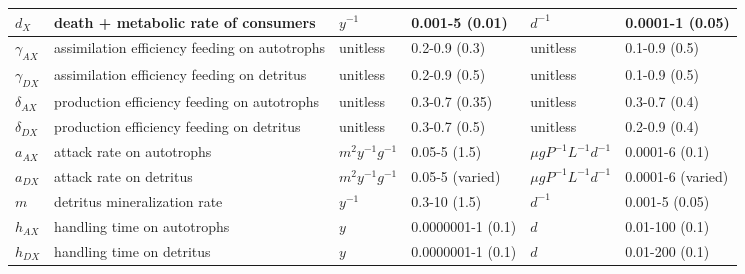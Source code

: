\documentclass[12pt,a4paper,oneside]{article}
\begin{document}
\begin{center}
{\begin{tabular}{ | p{1.5cm} |  p{4cm} | p{1.75cm} | p{2.5cm} || p{2.25cm} | p{2cm} | }
\(d_{X}\) & death + metabolic rate of consumers & \(y^{-1}\) & 0.001-5 (0.01) & \(d^{-1}\) & 0.0001-1 (0.05)\\\hline

\(\gamma_{AX}\) & assimilation efficiency  feeding on autotrophs & unitless & 0.2-0.9 (0.3) & unitless   & 0.1-0.9 (0.5)\\\hline

\(\gamma_{DX}\) & assimilation efficiency  feeding on detritus & unitless & 0.2-0.9 (0.5) & unitless &  0.1-0.9 (0.5)\\\hline

\(\delta_{AX}\) & production efficiency  feeding on autotrophs & unitless & 0.3-0.7 (0.35) & unitless   & 0.3-0.7 (0.4)\\\hline

\(\delta_{DX}\) & production efficiency feeding on detritus & unitless &  0.3-0.7 (0.5) & unitless &  0.2-0.9 (0.4)\\\hline

\(a_{AX}\) & attack rate  on autotrophs & \(m^{2}y^{-1}g^{-1}\) & 0.05-5 (1.5) & \(\mu gP^{-1}L^{-1}d^{-1}\) &  0.0001-6 (0.1)\\\hline

\(a_{DX}\) & attack rate on detritus & \(m^{2}y^{-1}g^{-1}\) & 0.05-5 (varied) & \(\mu gP^{-1}L^{-1}d^{-1}\) & 0.0001-6 (varied)\\\hline

\(m\) & detritus mineralization rate & \(y^{-1}\) & 0.3-10 (1.5) & \(d^{-1}\) &  0.001-5 (0.05)\\
  \hline
\(h_{AX}\) & handling time on autotrophs & \(y\) & 0.0000001-1 (0.1) &
\(d\) & 0.01-100 (0.1)\\
  \hline
\(h_{DX}\) & handling time on detritus & \(y\) & 0.0000001-1 (0.1) &
\(d\) &  0.01-200 (0.1)\\
  \hline
  \end{tabular}}
\end{center}

\end{document}
